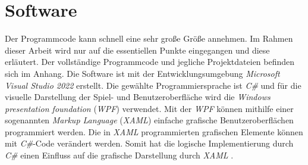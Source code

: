 
\chapter{Software}
Der Programmcode kann schnell eine sehr große Größe annehmen. Im Rahmen dieser Arbeit wird nur auf die essentiellen Punkte eingegangen und diese erläutert. Der vollständige Programmcode und jegliche Projektdateien befinden sich im Anhang. Die Software ist mit der Entwicklungsumgebung \textit{Microsoft Visual Studio 2022} erstellt. Die gewählte Programmiersprache ist \textit{C\#} und für die visuelle Darstellung der Spiel- und Benutzeroberfläche wird die \textit{Windows presentation foundation} (\textit{WPF}) verwendet. Mit der \textit{WPF} können mithilfe einer sogenannten \textit{Markup Language} (\textit{XAML}) einfache grafische Benutzeroberflächen programmiert werden. Die in \textit{XAML} programmierten grafischen Elemente können mit \textit{C\#}-Code verändert werden. Somit hat die logische Implementierung durch \textit{C\#} einen Einfluss auf die grafische Darstellung durch \textit{XAML} \cite{WPF}.
